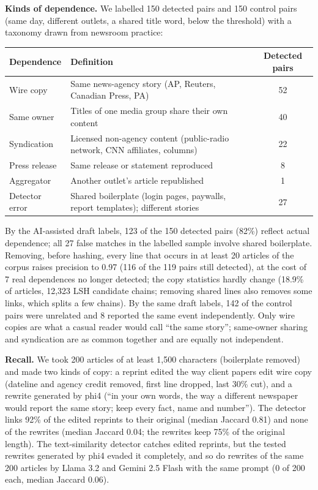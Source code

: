 \textbf{Kinds of dependence.} We labelled 150 detected pairs and 150 control pairs (same day, different outlets, a shared title word, below the threshold) with a taxonomy drawn from newsroom practice:

\begin{table}[htbp]\centering\small
\begin{tabularx}{\linewidth}{lYc}
\toprule
Dependence & Definition & Detected pairs \\
\midrule
Wire copy & Same news-agency story (AP, Reuters, Canadian Press, PA) & 52 \\
Same owner & Titles of one media group share their own content & 40 \\
Syndication & Licensed non-agency content (public-radio network, CNN affiliates, columns) & 22 \\
Press release & Same release or statement reproduced & 8 \\
Aggregator & Another outlet's article republished & 1 \\
Detector error & Shared boilerplate (login pages, paywalls, report templates); different stories & 27 \\
\bottomrule
\end{tabularx}
\end{table}

By the AI-assisted draft labels, 123 of the 150 detected pairs (82\%) reflect actual dependence; all 27 false matches in the labelled sample involve shared boilerplate. Removing, before hashing, every line that occurs in at least 20 articles of the corpus raises precision to 0.97 (116 of the 119 pairs still detected), at the cost of 7 real dependences no longer detected; the copy statistics hardly change (18.9\% of articles, 12,323 LSH candidate chains; removing shared lines also removes some links, which splits a few chains). By the same draft labels, 142 of the control pairs were unrelated and 8 reported the same event independently. Only wire copies are what a casual reader would call ``the same story''; same-owner sharing and syndication are as common together and are equally not independent.

\textbf{Recall.} We took 200 articles of at least 1,500 characters (boilerplate removed) and made two kinds of copy: a reprint edited the way client papers edit wire copy (dateline and agency credit removed, first line dropped, last 30\% cut), and a rewrite generated by phi4 (``in your own words, the way a different newspaper would report the same story; keep every fact, name and number''). The detector links 92\% of the edited reprints to their original (median Jaccard 0.81) and none of the rewrites (median Jaccard 0.04; the rewrites keep 75\% of the original length). The text-similarity detector catches edited reprints, but the tested rewrites generated by phi4 evaded it completely, and so do rewrites of the same 200 articles by Llama 3.2 and Gemini 2.5 Flash with the same prompt (0 of 200 each, median Jaccard 0.06).

